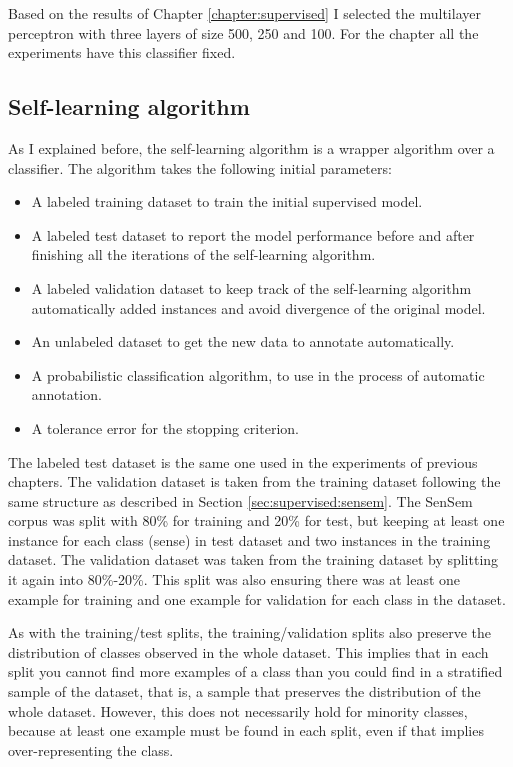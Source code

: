 Based on the results of Chapter \ref{chapter:supervised} I selected the
multilayer perceptron with three layers of size 500, 250 and 100. For the
chapter all the experiments have this classifier fixed.

\subsection{Self-learning algorithm}\label{sec:self-learning:algorithm}

As I explained before, the self-learning algorithm is a wrapper algorithm over
a classifier. The algorithm takes the following initial parameters:

\begin{itemize}
  \item A labeled training dataset to train the initial supervised model.
  \item A labeled test dataset to report the model performance before and after
    finishing all the iterations of the self-learning algorithm.
  \item A labeled validation dataset to keep track of the self-learning
    algorithm automatically added instances and avoid divergence of the
    original model.
  \item An unlabeled dataset to get the new data to annotate automatically.
  \item A probabilistic classification algorithm, to use in the process of
    automatic annotation.
  \item A tolerance error for the stopping criterion.
\end{itemize}

The labeled test dataset is the same one used in the experiments of previous
chapters. The validation dataset is taken from the training dataset following
the same structure as described in Section \ref{sec:supervised:sensem}. The
SenSem corpus was split with 80\% for training and 20\% for test, but keeping
at least one instance for each class (sense) in test dataset and two instances
in the training dataset. The validation dataset was taken from the training
dataset by splitting it again into 80\%-20\%. This split was also ensuring
there was at least one example for training and one example for validation for
each class in the dataset. 

As with the training/test splits, the training/validation splits also preserve
the distribution of classes observed in the whole dataset. This implies that in
each split you cannot find more examples of a class than you could find in a
stratified sample of the dataset, that is, a sample that preserves the
distribution of the whole dataset. However, this does not necessarily hold for
minority classes, because at least one example must be found in each split,
even if that implies over-representing the class.

